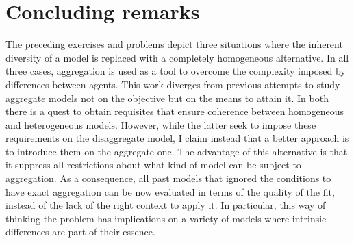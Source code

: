 \documentclass[english, a4paper, 12pt]{article}
\begin{document}
%
%


\section{Concluding remarks} \label{sec:Conclusion}

The preceding exercises and problems depict three situations where the inherent diversity of a model is replaced with a completely homogeneous alternative. In all three cases, aggregation is used as a tool to overcome the complexity imposed by differences between agents. This work diverges from previous attempts to study aggregate models not on the objective but on the means to attain it. In both there is a quest to obtain requisites that ensure coherence between homogeneous and heterogeneous models. However, while the latter seek to impose these requirements on the disaggregate model, I claim instead that a better approach is to introduce them on the aggregate one. The advantage of this alternative is that it suppress all restrictions about what kind of model can be subject to aggregation. As a consequence, all past models that ignored the conditions to have exact aggregation can be now evaluated in terms of the quality of the fit, instead of the lack of the right context to apply it. In particular, this way of thinking the problem has implications on a variety of models where intrinsic differences are part of their essence.
\end{document}
